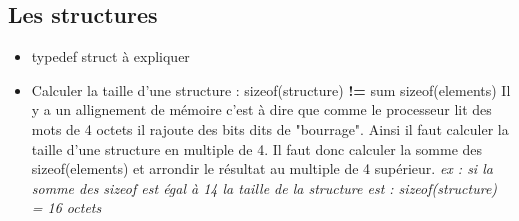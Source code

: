 \documentclass[12pt,a4paper]{article}
\begin{document}
\subsection{Les structures}
\begin{itemize}
\item typedef struct à expliquer
\item Calculer la taille d'une structure : sizeof(structure) \textbf{!=} sum sizeof(elements)
\newline Il y a un allignement de mémoire c'est à dire que comme le processeur lit des mots de 4 octets il rajoute des bits dits de "bourrage". Ainsi il faut calculer la taille d'une structure en multiple de 4.
\newline Il faut donc calculer la somme des sizeof(elements) et arrondir le résultat au multiple de 4 supérieur. \textit{ex : si la somme des sizeof est égal à 14 la taille de la structure est : sizeof(structure) = 16 octets}
\end{itemize}
\end{document}
